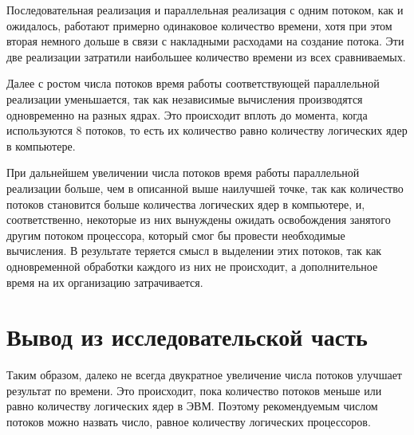 Последовательная реализация и параллельная реализация с одним потоком, как и ожидалось, работают примерно одинаковое количество времени, хотя при этом вторая немного дольше в связи с накладными расходами на создание потока. Эти две реализации затратили наибольшее количество времени из всех сравниваемых.

Далее с ростом числа потоков время работы соответствующей параллельной реализации уменьшается, так как независимые вычисления производятся одновременно на разных ядрах. Это происходит вплоть до момента, когда используются 8 потоков, то есть их количество равно количеству логических ядер в компьютере.

При дальнейшем увеличении числа потоков время работы параллельной реализации больше, чем в описанной выше наилучшей точке, так как количество потоков становится больше количества логических ядер в компьютере, и, соответственно, некоторые из них вынуждены ожидать освобождения занятого другим потоком процессора, который смог бы провести необходимые вычисления. В результате теряется смысл в выделении этих потоков, так как одновременной обработки каждого из них не происходит, а дополнительное время на их организацию затрачивается.



\section{Вывод из исследовательской часть}

Таким образом, далеко не всегда двукратное увеличение числа потоков улучшает результат по времени. Это происходит, пока количество потоков меньше или равно количеству логических ядер в ЭВМ. Поэтому рекомендуемым числом потоков можно назвать число, равное количеству логических процессоров.